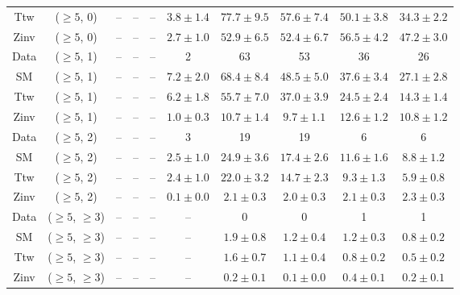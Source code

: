 \begin{table}[h!]
{\begin{tabular}{cccccccccc}
	Ttw & ($\ge5$, 0) & -- & -- & -- & $3.8\pm 1.4$ & $77.7\pm 9.5$ & $57.6\pm 7.4$ & $50.1\pm 3.8$ & $34.3\pm 2.2$ \\[0.5ex] 
	Zinv & ($\ge5$, 0) & -- & -- & -- & $2.7\pm 1.0$ & $52.9\pm 6.5$ & $52.4\pm 6.7$ & $56.5\pm 4.2$ & $47.2\pm 3.0$ \\[0.5ex] 
	Data & ($\ge5$, 1) & -- & -- & -- & 2 & 63 & 53 & 36 & 26 \\[0.5ex] 
	SM & ($\ge5$, 1) & -- & -- & -- & $7.2\pm 2.0$ & $68.4\pm 8.4$ & $48.5\pm 5.0$ & $37.6\pm 3.4$ & $27.1\pm 2.8$ \\[0.5ex] 
	Ttw & ($\ge5$, 1) & -- & -- & -- & $6.2\pm 1.8$ & $55.7\pm 7.0$ & $37.0\pm 3.9$ & $24.5\pm 2.4$ & $14.3\pm 1.4$ \\[0.5ex] 
	Zinv & ($\ge5$, 1) & -- & -- & -- & $1.0\pm 0.3$ & $10.7\pm 1.4$ & $9.7\pm 1.1$ & $12.6\pm 1.2$ & $10.8\pm 1.2$ \\[0.5ex] 
	Data & ($\ge5$, 2) & -- & -- & -- & 3 & 19 & 19 & 6 & 6 \\[0.5ex] 
	SM & ($\ge5$, 2) & -- & -- & -- & $2.5\pm 1.0$ & $24.9\pm 3.6$ & $17.4\pm 2.6$ & $11.6\pm 1.6$ & $8.8\pm 1.2$ \\[0.5ex] 
	Ttw & ($\ge5$, 2) & -- & -- & -- & $2.4\pm 1.0$ & $22.0\pm 3.2$ & $14.7\pm 2.3$ & $9.3\pm 1.3$ & $5.9\pm 0.8$ \\[0.5ex] 
	Zinv & ($\ge5$, 2) & -- & -- & -- & $0.1\pm 0.0$ & $2.1\pm 0.3$ & $2.0\pm 0.3$ & $2.1\pm 0.3$ & $2.3\pm 0.3$ \\[0.5ex] 
	Data & ($\ge5$, $\ge3$) & -- & -- & -- & -- & 0 & 0 & 1 & 1 \\[0.5ex] 
	SM & ($\ge5$, $\ge3$) & -- & -- & -- & -- & $1.9\pm 0.8$ & $1.2\pm 0.4$ & $1.2\pm 0.3$ & $0.8\pm 0.2$ \\[0.5ex] 
	Ttw & ($\ge5$, $\ge3$) & -- & -- & -- & -- & $1.6\pm 0.7$ & $1.1\pm 0.4$ & $0.8\pm 0.2$ & $0.5\pm 0.2$ \\[0.5ex] 
	Zinv & ($\ge5$, $\ge3$) & -- & -- & -- & -- & $0.2\pm 0.1$ & $0.1\pm 0.0$ & $0.4\pm 0.1$ & $0.2\pm 0.1$ \\[0.5ex] 
	\hline
	\hline
\end{tabular}}
\end{table}
